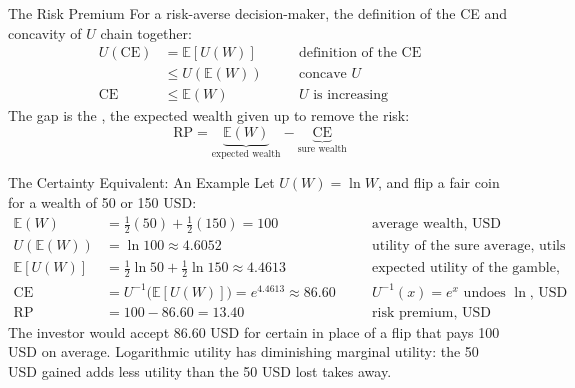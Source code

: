 \documentclass[aspectratio=169,11pt]{beamer}
\newcommand{\E}{\mathbb{E}}
\newcommand{\CE}{\mathrm{CE}}
\newcommand{\RP}{\mathrm{RP}}
\begin{document}
\begin{frame}{The Risk Premium}
  For a risk-averse decision-maker, the definition of the CE and concavity of $U$ chain together:
  \[
    \begin{aligned}
      U(\CE)&=\E[U(W)] &&\quad\text{definition of the CE}\\
      &\le U(\E(W)) &&\quad\text{concave }U\\
      \CE&\le\E(W) &&\quad U\text{ is increasing}
    \end{aligned}
  \]
  The gap is the , the expected wealth given up to remove the risk:
  \[
    \boxed{\RP=\underbrace{\E(W)}_{\text{expected wealth}}-\underbrace{\CE}_{\text{sure wealth}}}
  \]
\end{frame}

\begin{frame}{The Certainty Equivalent: An Example}
  Let $U(W)=\ln W$, and flip a fair coin for a wealth of 50 or 150 USD:
  \[
    \begin{aligned}
      \E(W)&=\tfrac12(50)+\tfrac12(150)=100 &&\quad\text{average wealth, USD}\\
      U(\E(W))&=\ln100\approx4.6052 &&\quad\text{utility of the sure average, utils}\\
      \E[U(W)]&=\tfrac12\ln50+\tfrac12\ln150\approx4.4613 &&\quad\text{expected utility of the gamble, utils}\\
      \CE&=U^{-1}\bigl(\E[U(W)]\bigr)=e^{4.4613}\approx86.60 &&\quad U^{-1}(x)=e^{x}\text{ undoes }{\ln}\text{, USD}\\
      \RP&=100-86.60=13.40 &&\quad\text{risk premium, USD}
    \end{aligned}
  \]
  The investor would accept 86.60 USD for certain in place of a flip that pays 100 USD on
  average. Logarithmic utility has diminishing marginal utility: the 50 USD gained adds less
  utility than the 50 USD lost takes away.
\end{frame}
\end{document}
